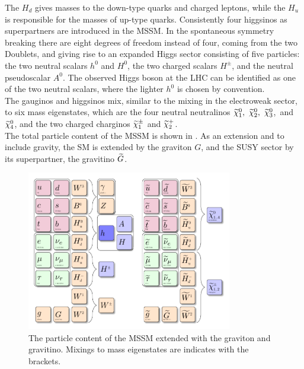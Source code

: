The $H_d$ gives masses to the down-type quarks and charged leptons, while the $H_u$ is responsible for the masses of up-type quarks. Consistently four higgsinos as superpartners are introduced in the MSSM. In the spontaneous symmetry breaking there are eight degrees of freedom instead of four, coming from the two Doublets, and giving rise to an expanded Higgs sector consisting of five particles: the two neutral scalars $h^0$ and $H^0$, the two charged scalars $H^{\pm}$, and the neutral pseudoscalar $A^0$. The observed Higgs boson at the LHC can be identified as one of the two neutral scalars, where the lighter $h^0$ is chosen by convention.\\
The gauginos and higgsinos mix, similar to the mixing in the electroweak sector, to six mass eigenstates, which are the four neutral neutralinos $\widetilde{\chi}^{0}_{1},~\widetilde{\chi}^{0}_{2},~\widetilde{\chi}^{0}_{3}$,~and $\widetilde{\chi}^{0}_{4}$, and the two charged charginos $\widetilde{\chi}^\pm_{1}$ and $\widetilde{\chi}^{+}_{2}$.\\
The total particle content of the MSSM is shown in . As an extension and to include gravity, the SM is extended by the graviton $G$, and the SUSY sector by its superpartner, the gravitino $\widetilde{G}$.

\begin{figure}[!htpb]
 \centering
 \includegraphics[width=0.8\textwidth]{figures/general/MSSM}
 \caption{The particle content of the MSSM extended with the graviton and gravitino. Mixings to mass eigenstates are indicates with the brackets.}
 \label{fig:mssm}
\end{figure}

